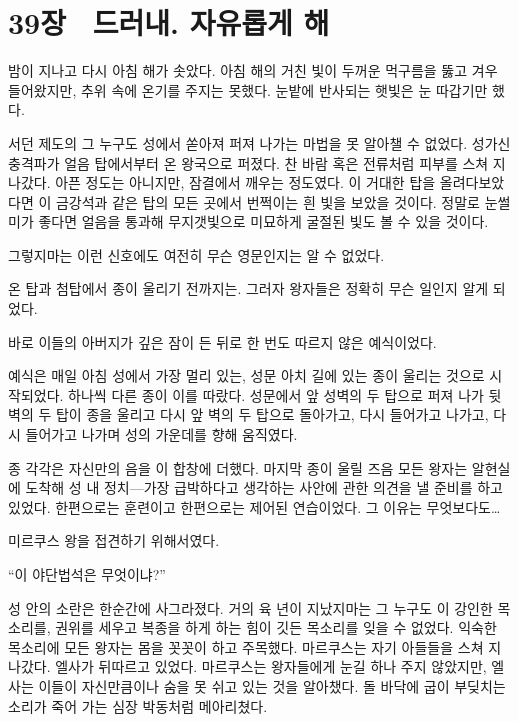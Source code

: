 

\chapter[39장  드러내. 자유롭게 해][39장\hspace*{.5em}드러내. 자유롭게 해]{39장 \ 드러내. 자유롭게 해}



밤이 지나고 다시 아침 해가 솟았다. 아침 해의 거친 빛이 두꺼운 먹구름을 뚫고 겨우 들어왔지만, 추위 속에 온기를 주지는 못했다. 눈밭에 반사되는 햇빛은 눈 따갑기만 했다.

서던 제도의 그 누구도 성에서 쏟아져 퍼져 나가는 마법을 못 알아챌 수 없었다. 성가신 충격파가 얼음 탑에서부터 온 왕국으로 퍼졌다. 찬 바람 혹은 전류처럼 피부를 스쳐 지나갔다. 아픈 정도는 아니지만, 잠결에서 깨우는 정도였다. 이 거대한 탑을 올려다보았다면 이 금강석과 같은 탑의 모든 곳에서 번쩍이는 흰 빛을 보았을 것이다. 정말로 눈썰미가 좋다면 얼음을 통과해 무지갯빛으로 미묘하게 굴절된 빛도 볼 수 있을 것이다.

그렇지마는 이런 신호에도 여전히 무슨 영문인지는 알 수 없었다.

온 탑과 첨탑에서 종이 울리기 전까지는. 그러자 왕자들은 정확히 무슨 일인지 알게 되었다.

바로 이들의 아버지가 깊은 잠이 든 뒤로 한 번도 따르지 않은 예식이었다.

예식은 매일 아침 성에서 가장 멀리 있는, 성문 아치 길에 있는 종이 울리는 것으로 시작되었다. 하나씩 다른 종이 이를 따랐다. 성문에서 앞 성벽의 두 탑으로 퍼져 나가 뒷벽의 두 탑이 종을 울리고 다시 앞 벽의 두 탑으로 돌아가고, 다시 들어가고 나가고, 다시 들어가고 나가며 성의 가운데를 향해 움직였다.

종 각각은 자신만의 음을 이 합창에 더했다. 마지막 종이 울릴 즈음 모든 왕자는 알현실에 도착해 성 내 정치—가장 급박하다고 생각하는 사안에 관한 의견을 낼 준비를 하고 있었다. 한편으로는 훈련이고 한편으로는 제어된 연습이었다. 그 이유는 무엇보다도\ldots

미르쿠스 왕을 접견하기 위해서였다.

``이 야단법석은 무엇이냐?''

성 안의 소란은 한순간에 사그라졌다. 거의 육 년이 지났지마는 그 누구도 이 강인한 목소리를, 권위를 세우고 복종을 하게 하는 힘이 깃든 목소리를 잊을 수 없었다. 익숙한 목소리에 모든 왕자는 몸을 꼿꼿이 하고 주목했다. 마르쿠스는 자기 아들들을 스쳐 지나갔다. 엘사가 뒤따르고 있었다. 마르쿠스는 왕자들에게 눈길 하나 주지 않았지만, 엘사는 이들이 자신만큼이나 숨을 못 쉬고 있는 것을 알아챘다. 돌 바닥에 굽이 부딪치는 소리가 죽어 가는 심장 박동처럼 메아리쳤다.

